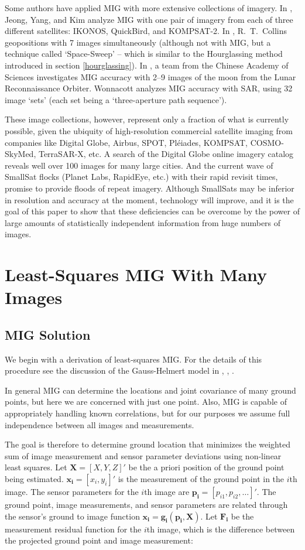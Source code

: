 \documentclass[10pt]{amsart}
\newcommand{\imgmeas}{\pmb{x_{i}}}
\newcommand{\grnd}{\pmb{X}}
\newcommand{\sensmeas}{\pmb{p_i}}
\begin{document}
Some authors have applied MIG with more extensive collections of imagery. In
\cite{JEONG_SIX}, Jeong, Yang, and Kim analyze MIG with one pair of imagery from
each of three different satellites: IKONOS, QuickBird, and KOMPSAT-2. In
\cite{PLANE_COLLINS}, R.~T.~Collins geopositions with 7 images simultaneously
(although not with MIG, but a technique called `Space-Sweep' -- which is
similar to the Hourglassing method introduced in section \ref{hourglassing}).
In \cite{LRO_NINE}, a team from the Chinese Academy of Sciences investigates MIG
accuracy with 2--9 images of the moon from the Lunar Reconnaissance
Orbiter. Wonnacott \cite{WONNACOT_32_3} analyzes MIG accuracy with SAR, using 32
image `sets' (each set being a `three-aperture path sequence').

These image collections, however, represent only a fraction of what is currently
possible, given the ubiquity of high-resolution commercial satellite imaging
from companies like Digital Globe, Airbus, SPOT, Pl\'eiades, KOMPSAT,
COSMO-SkyMed, TerraSAR-X, etc. A search of the Digital Globe online imagery
catalog \cite{BROWSE_DG} reveals well over 100 images for many large cities. And
the current wave of SmallSat flocks (Planet Labs, RapidEye, etc.) with their
rapid revisit times, promise to provide floods of repeat imagery. Although
SmallSats may be inferior in resolution and accuracy at the moment, technology
will improve, and it is the goal of this paper to show that these deficiencies
can be overcome by the power of large amounts of statistically independent
information from huge numbers of images.

\section{Least-Squares MIG With Many Images}
\subsection{MIG Solution}\label{MIG}
We begin with a derivation of least-squares MIG. For the details of this
procedure see the discussion of the Gauss-Helmert model in \cite{LSQRMIG},
\cite{PHOTO_CV}, \cite{MANUAL}.

In general MIG can determine the locations and joint covariance of many ground
points, but here we are concerned with just one point. Also, MIG is capable of
appropriately handling known correlations, but for our purposes we assume full
independence between all images and measurements.

The goal is therefore to determine ground location that minimizes the weighted
sum of image measurement and sensor parameter deviations using non-linear least
squares. Let $\grnd = [X, Y, Z]'$ be the a priori position of the ground point
being estimated.  $\imgmeas = [x_{i}, y_{i}]'$ is the measurement of the ground
point in the $i$th image.  The sensor parameters for the $i$th image are
$\sensmeas = [p_{i1}, p_{i2}, \ldots]'$. The ground point, image measurements,
and sensor parameters are related through the sensor's ground to image function
$\imgmeas = \pmb{g_i}(\sensmeas, \grnd)$.  Let $\pmb{F_{i}}$ be the measurement
residual function for the $i$th image, which is the difference between the
projected ground point and image measurement:
\end{document}
